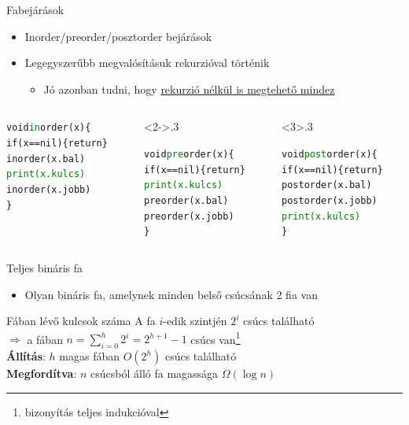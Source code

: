 \documentclass{beamer}
\begin{document}
\begin{frame}[fragile]{Fabejárások}
	\begin{itemize}
		\item Inorder/preorder/posztorder bejárások
		\item Legegyszerűbb megvalósításuk rekurzióval történik
		\begin{itemize}
			\item Jó azonban tudni, hogy  \href{https://sites.google.com/site/debforit/efficient-binary-tree-traversal-with-two-pointers}{rekurzió nélkül is megtehető mindez}
		\end{itemize}
	\end{itemize}
	\begin{columns}
		\begin{column}{.3\linewidth}
\begin{alltt}
\small
void \textcolor{green}{in}order(x)\{
  if(x==nil)\{return\}
  inorder(x.bal)
  \textcolor{green}{print(x.kulcs)}
  inorder(x.jobb)
\}
\end{alltt}
		\end{column}
		\begin{column}<2->{.3\linewidth}
\begin{alltt}
\small
void \textcolor{green}{pre}order(x)\{
  if(x==nil)\{return\}
  \textcolor{green}{print(x.kulcs)}
  preorder(x.bal)
  preorder(x.jobb)
\}
\end{alltt}
		\end{column}
		\begin{column}<3>{.3\linewidth}
\begin{alltt}
\small
void \textcolor{green}{post}order(x)\{
  if(x==nil)\{return\}
  postorder(x.bal)
  postorder(x.jobb)
  \textcolor{green}{print(x.kulcs)}
\}
\end{alltt}
		\end{column}
	\end{columns}
\end{frame}

\begin{frame}{Teljes bináris fa}
	\begin{itemize}
		\item Olyan bináris fa, amelynek minden belső csúcsának 2 fia van
	\end{itemize}
	\begin{block}{Fában lévő kulcsok száma}
		A fa $i$-edik szintjén $2^i$ csúcs található \\ \pause $\Rightarrow$ a 
		fában $n=\sum\limits_{i=0}^{h} 2^i=2^{h+1}-1$ csúcs 
		van\footnote{bizonyítás teljes indukcióval} \\
		\textbf{Állítás}: $h$ magas fában $O(2^h)$ csúcs található \\ \pause
		\textbf{Megfordítva}: $n$ csúcsból álló fa magassága $\Omega(\log n)$
	\end{block}
\end{frame}
\end{document}
